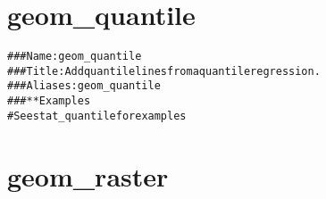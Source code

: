 \documentclass[a4paper,titlepage]{tufte-handout}\usepackage{graphicx, color}
\makeatletter
\newcommand{\hlcomment}[1]{\textcolor[rgb]{0.180392156862745,0.6,0.341176470588235}{#1}}%
\newenvironment{kframe}{%
 \def\at@end@of@kframe{}%
 \ifinner\ifhmode%
  \def\at@end@of@kframe{\end{minipage}}%
  \begin{minipage}{\columnwidth}%
 \fi\fi%
 \def\FrameCommand##1{\hskip\@totalleftmargin \hskip-\fboxsep
 \colorbox{shadecolor}{##1}\hskip-\fboxsep
     \hskip-\linewidth \hskip-\@totalleftmargin \hskip\columnwidth}%
 \MakeFramed {\advance\hsize-\width
   \@totalleftmargin\z@ \linewidth\hsize
   \@setminipage}}%
 {\par\unskip\endMakeFramed%
 \at@end@of@kframe}
\newenvironment{knitrout}{}{} %
\makeatother
\begin{document}
\section{geom\_quantile}

\begin{knitrout}
\color{fgcolor}\begin{kframe}
\begin{alltt}
\hlcomment{### Name: geom_quantile}
\hlcomment{### Title: Add quantile lines from a quantile regression.}
\hlcomment{### Aliases: geom_quantile}
\hlcomment{### ** Examples}
\hlcomment{# See stat_quantile for examples}
\end{alltt}
\end{kframe}
\end{knitrout}


\section{geom\_raster}
\end{document}
